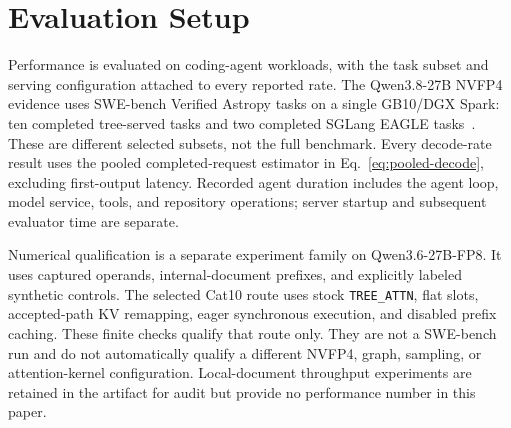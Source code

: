 \documentclass[conference]{IEEEtran}
\begin{document}
\section{Evaluation Setup}
\label{sec:protocol}
Performance is evaluated on coding-agent workloads, with the task subset and serving configuration attached to every reported rate. The Qwen3.8-27B NVFP4 evidence uses SWE-bench Verified Astropy tasks on a single GB10/DGX Spark: ten completed tree-served tasks and two completed SGLang EAGLE tasks~\cite{lumo2026archive,jimenez2024swe}. These are different selected subsets, not the full benchmark. Every decode-rate result uses the pooled completed-request estimator in Eq.~\ref{eq:pooled-decode}, excluding first-output latency. Recorded agent duration includes the agent loop, model service, tools, and repository operations; server startup and subsequent evaluator time are separate.

Numerical qualification is a separate experiment family on Qwen3.6-27B-FP8. It uses captured operands, internal-document prefixes, and explicitly labeled synthetic controls. The selected Cat10 route uses stock \texttt{TREE\_ATTN}, flat slots, accepted-path KV remapping, eager synchronous execution, and disabled prefix caching. These finite checks qualify that route only. They are not a SWE-bench run and do not automatically qualify a different NVFP4, graph, sampling, or attention-kernel configuration. Local-document throughput experiments are retained in the artifact for audit but provide no performance number in this paper.
\end{document}
